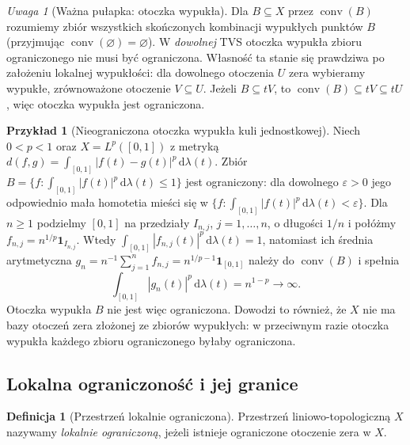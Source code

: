 \documentclass[11pt,a4paper]{article}
\numberwithin{equation}{section}
\theoremstyle{plain}
\theoremstyle{definition}
\newtheorem{definicja}[twierdzenie]{Definicja}
\newtheorem{przyklad}[twierdzenie]{Przykład}
\theoremstyle{remark}
\newtheorem{uwaga}[twierdzenie]{Uwaga}
\begin{document}
\begin{uwaga}[Ważna pułapka: otoczka wypukła]
Dla $B\subseteq X$ przez $\operatorname{conv}(B)$ rozumiemy
zbiór wszystkich skończonych kombinacji wypukłych punktów $B$
(przyjmując $\operatorname{conv}(\varnothing)=\varnothing$).
W \emph{dowolnej} TVS otoczka wypukła zbioru ograniczonego
nie musi być ograniczona. Własność ta stanie się prawdziwa
po założeniu lokalnej wypukłości: dla dowolnego otoczenia
$U$ zera wybieramy wypukłe, zrównoważone otoczenie
$V\subseteq U$. Jeżeli $B\subseteq tV$, to
$\operatorname{conv}(B)\subseteq tV\subseteq tU$, więc
otoczka wypukła jest ograniczona.
\end{uwaga}

\begin{przyklad}[Nieograniczona otoczka wypukła kuli jednostkowej]
\label{ex:quasinorm-convex-hull}
Niech $0<p<1$ oraz $X=L^p([0,1])$ z metryką
$d(f,g)=\int_{[0,1]}|f(t)-g(t)|^p\,\mathrm d\lambda(t)$.
Zbiór $B=\{f:\int_{[0,1]}|f(t)|^p\,\mathrm d\lambda(t)\le1\}$ jest
ograniczony: dla dowolnego $\varepsilon>0$ jego odpowiednio
mała homotetia mieści się w
$\{f:\int_{[0,1]}|f(t)|^p\,\mathrm d\lambda(t)<\varepsilon\}$.
Dla $n\ge1$ podzielmy $[0,1]$ na przedziały $I_{n,j}$,
$j=1,\ldots,n$, o długości $1/n$ i połóżmy
$f_{n,j}=n^{1/p}\mathbf1_{I_{n,j}}$. Wtedy
$\int_{[0,1]}|f_{n,j}(t)|^p\,\mathrm d\lambda(t)=1$,
natomiast ich średnia arytmetyczna
$g_n=n^{-1}\sum_{j=1}^n f_{n,j}=n^{1/p-1}\mathbf1_{[0,1]}$
należy do $\operatorname{conv}(B)$ i spełnia
\[
 \int_{[0,1]}|g_n(t)|^p\,\mathrm d\lambda(t)=n^{1-p}\longrightarrow\infty.
\]
Otoczka wypukła $B$ nie jest więc ograniczona. Dowodzi to
również, że $X$ nie ma bazy otoczeń zera złożonej ze
zbiorów wypukłych: w przeciwnym razie otoczka wypukła
każdego zbioru ograniczonego byłaby ograniczona.
\end{przyklad}

\subsection{Lokalna ograniczoność i jej granice}

\begin{definicja}[Przestrzeń lokalnie ograniczona]
Przestrzeń liniowo-topologiczną $X$ nazywamy
\emph{lokalnie ograniczoną}, jeżeli istnieje ograniczone
otoczenie zera w $X$.
\end{definicja}
\end{document}
